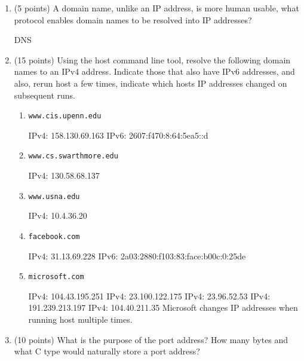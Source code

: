 \documentclass{article}[9pt]
\newenvironment{answerfont}{\fontfamily{qhv}\selectfont}{\par}
\newenvironment{myanswer}{\begin{mdframed}\begin{answerfont}}{\end{answerfont}\end{mdframed}}
\begin{document}
\begin{enumerate}
\item (5 points) A domain name, unlike an IP address, is more human usable, what protocol enables domain names to be resolved into IP addresses?

    \begin{myanswer}
    DNS
    \end{myanswer}


\item (15 points) Using the host command line tool, resolve the following domain names to an IPv4 address. Indicate those that also have IPv6 addresses, and also, rerun host a few times,
 indicate which hosts IP addresses changed on subsequent runs.

  \begin{enumerate}
  \item \texttt{www.cis.upenn.edu}
    \begin{myanswer}
    IPv4: 158.130.69.163\n
    IPv6: 2607:f470:8:64:5ea5::d
    \end{myanswer}

  \item \texttt{www.cs.swarthmore.edu}
    \begin{myanswer}
    IPv4: 130.58.68.137
    \end{myanswer}

  \item \texttt{www.usna.edu}
    \begin{myanswer}
    IPv4: 10.4.36.20
    \end{myanswer}

  \item \texttt{facebook.com}
    \begin{myanswer}
    IPv4: 31.13.69.228\n
    IPv6: 2a03:2880:f103:83:face:b00c:0:25de
    \end{myanswer}

  \item \texttt{microsoft.com}
    \begin{myanswer}
    IPv4: 104.43.195.251\n
    IPv4: 23.100.122.175\n
    IPv4: 23.96.52.53\n
    IPv4: 191.239.213.197\n
    IPv4: 104.40.211.35\n
    Microsoft changes IP addresses when running host multiple times.
    \end{myanswer}

  \end{enumerate}

\item (10 points) What is the purpose of the port address? How many bytes and what C type would naturally store a port address?


\end{enumerate}
\end{document}
